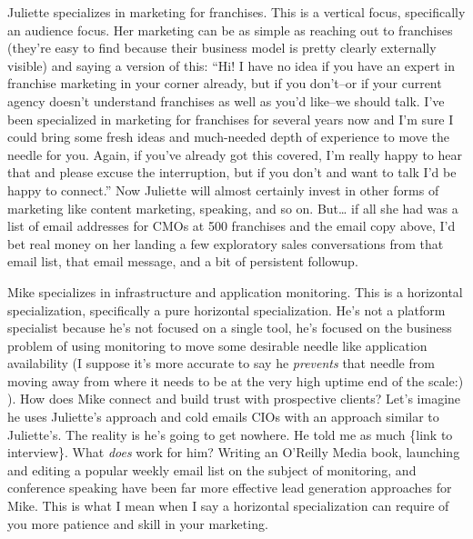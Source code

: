 Juliette specializes in marketing for franchises. This is a vertical focus, specifically an audience focus. Her marketing can be as simple as reaching out to franchises (they're easy to find because their business model is pretty clearly externally visible) and saying a version of this: ``Hi! I have no idea if you have an expert in franchise marketing in your corner already, but if you don't--or if your current agency doesn't understand franchises as well as you'd like--we should talk. I've been specialized in marketing for franchises for several years now and I'm sure I could bring some fresh ideas and much-needed depth of experience to move the needle for you. Again, if you've already got this covered, I'm really happy to hear that and please excuse the interruption, but if you don't and want to talk I'd be happy to connect.'' Now Juliette will almost certainly invest in other forms of marketing like content marketing, speaking, and so on. But\ldots{} if all she had was a list of email addresses for CMOs at 500 franchises and the email copy above, I'd bet real money on her landing a few exploratory sales conversations from that email list, that email message, and a bit of persistent followup.

Mike specializes in infrastructure and application monitoring. This is a horizontal specialization, specifically a pure horizontal specialization. He's not a platform specialist because he's not focused on a single tool, he's focused on the business problem of using monitoring to move some desirable needle like application availability (I suppose it's more accurate to say he \emph{prevents} that needle from moving away from where it needs to be at the very high uptime end of the scale:) ). How does Mike connect and build trust with prospective clients? Let's imagine he uses Juliette's approach and cold emails CIOs with an approach similar to Juliette's. The reality is he's going to get nowhere. He told me as much \{link to interview\}. What \emph{does} work for him? Writing an O'Reilly Media book, launching and editing a popular weekly email list on the subject of monitoring, and conference speaking have been far more effective lead generation approaches for Mike. This is what I mean when I say a horizontal specialization can require of you more patience and skill in your marketing.

